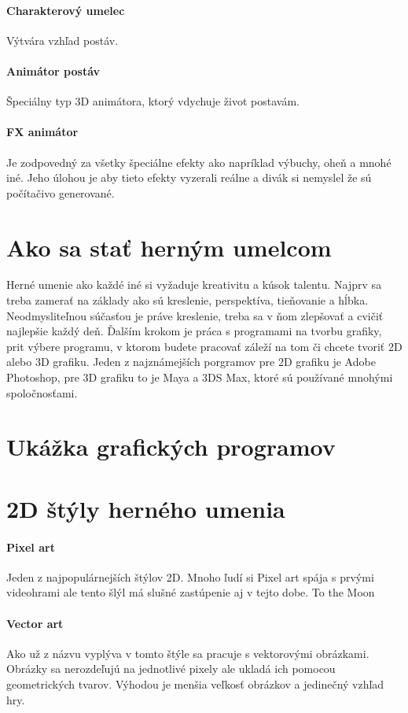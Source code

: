 \documentclass[10pt,twoside,slovak,a4paper]{article}
\begin{document}
\paragraph{Charakterový umelec} Výtvára vzhľad postáv.
\paragraph{Animátor postáv} Špeciálny typ 3D animátora, ktorý vdychuje život postavám.
\paragraph{FX animátor}Je zodpovedný za všetky špeciálne efekty ako napríklad výbuchy, oheň a mnohé iné. Jeho úlohou je aby tieto efekty vyzerali reálne a divák si nemyslel že sú počítačivo generované.

\section{Ako sa stať herným umelcom}
Herné umenie ako každé iné si vyžaduje kreativitu a kúsok talentu. Najprv sa treba zamerať na základy ako sú kreslenie, perspektíva, tieňovanie a hĺbka. Neodmysliteľnou súčasťou je práve kreslenie, treba sa v ňom zlepšovať a cvičiť najlepšie každý deň. Ďalším krokom je práca s programami na tvorbu grafiky, prit výbere programu, v ktorom budete pracovať záleží na tom či chcete tvoriť 2D alebo 3D grafiku. Jeden z najznámejších porgramov pre 2D grafiku je Adobe Photoshop, pre 3D grafiku to je Maya a 3DS Max, ktoré sú používané mnohými spoločnosťami.
\cite{1}
\section{Ukážka grafických programov}





\section{2D štýly herného umenia}
\cite{2D}
\paragraph{Pixel art}
Jeden z najpopulárnejších štýlov 2D. Mnoho ľudí si Pixel art spája s prvými videohrami ale tento šlýl má slušné zastúpenie aj v tejto dobe. 
To the Moon


\paragraph{Vector art}
Ako už z názvu vyplýva v tomto štýle sa pracuje s vektorovými obrázkami. Obrázky sa nerozdeľujú na jednotlivé pixely ale ukladá ich pomocou geometrických tvarov. Výhodou je menšia veľkosť obrázkov a jedinečný vzhľad hry.
\end{document}
